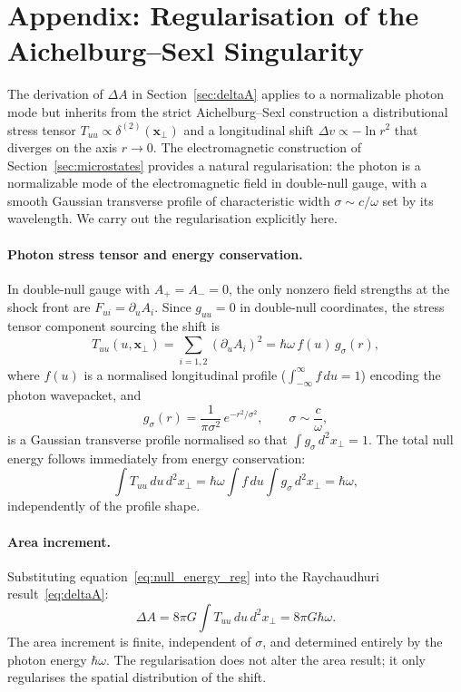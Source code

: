 \section{Appendix: Regularisation of the Aichelburg--Sexl Singularity}
\label{sec:as_reg}

The derivation of $\Delta A$ in Section~\ref{sec:deltaA} applies to 
a normalizable photon mode but inherits from the strict 
Aichelburg--Sexl construction a distributional stress tensor 
$T_{uu} \propto \delta^{(2)}(\mathbf{x}_\perp)$ and a longitudinal 
shift $\Delta v \propto -\ln r^2$ that diverges on the axis $r \to 0$. 
The electromagnetic construction of Section~\ref{sec:microstates} 
provides a natural regularisation: the photon is a normalizable 
mode of the electromagnetic field in double-null gauge, with a 
smooth Gaussian transverse profile of characteristic width 
$\sigma \sim c/\omega$ set by its wavelength. We carry out the 
regularisation explicitly here.

\paragraph{Photon stress tensor and energy conservation.}
In double-null gauge with $A_+ = A_- = 0$, the only nonzero field 
strengths at the shock front are $F_{ui} = \partial_u A_i$. Since 
$g_{uu} = 0$ in double-null coordinates, the stress tensor 
component sourcing the shift is
%
\begin{equation}
    T_{uu}(u, \mathbf{x}_\perp) 
    = \sum_{i=1,2}(\partial_u A_i)^2 
    = \hbar\omega\, f(u)\, g_\sigma(r),
    \label{eq:Tuu_reg}
\end{equation}
%
where $f(u)$ is a normalised longitudinal profile 
($\int_{-\infty}^{\infty} f\,du = 1$) encoding the photon 
wavepacket, and
%
\begin{equation}
    g_\sigma(r) 
    = \frac{1}{\pi\sigma^2}\,e^{-r^2/\sigma^2}, 
    \qquad \sigma \sim \frac{c}{\omega},
    \label{eq:gaussian_profile}
\end{equation}
%
is a Gaussian transverse profile normalised so that 
$\int g_\sigma\, d^2x_\perp = 1$. 
The total null energy follows immediately from energy conservation:
%
\begin{equation}
    \int T_{uu}\,du\,d^2x_\perp 
    = \hbar\omega \int f\,du \int g_\sigma\,d^2x_\perp 
    = \hbar\omega,
    \label{eq:null_energy_reg}
\end{equation}
%
independently of the profile shape.

\paragraph{Area increment.}
Substituting equation~\eqref{eq:null_energy_reg} into the 
Raychaudhuri result~\eqref{eq:deltaA}:
%
\begin{equation}
    \Delta A 
    = 8\pi G \int T_{uu}\,du\,d^2x_\perp 
    = 8\pi G\hbar\omega.
    \label{eq:deltaA_reg}
\end{equation}
%
The area increment is finite, independent of $\sigma$, and 
determined entirely by the photon energy $\hbar\omega$. The 
regularisation does not alter the area result; it only 
regularises the spatial distribution of the shift.

